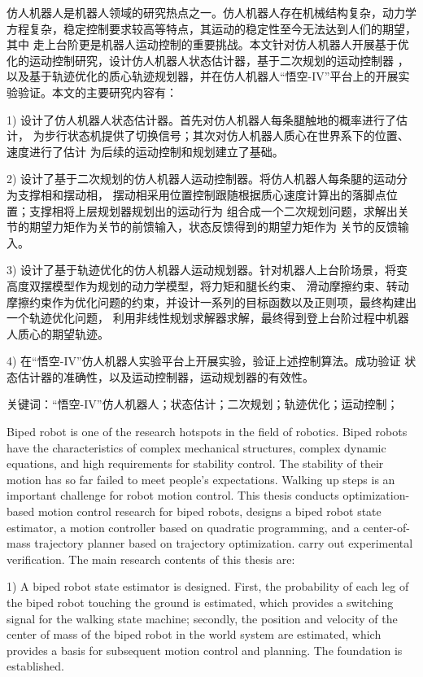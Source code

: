 \cleardoublepage
{}

仿人机器人是机器人领域的研究热点之一。仿人机器人存在机械结构复杂，动力学
方程复杂，稳定控制要求较高等特点，其运动的稳定性至今无法达到人们的期望，其中
走上台阶更是机器人运动控制的重要挑战。本文针对仿人机器人开展基于优化的运动控制研究，设计仿人机器人状态估计器，基于二次规划的运动控制器
，以及基于轨迹优化的质心轨迹规划器，并在仿人机器人“悟空-IV”平台上的开展实验验证。本文的主要研究内容有：

1) 设计了仿人机器人状态估计器。首先对仿人机器人每条腿触地的概率进行了估计，
为步行状态机提供了切换信号；其次对仿人机器人质心在世界系下的位置、速度进行了估计
为后续的运动控制和规划建立了基础。

2) 设计了基于二次规划的仿人机器人运动控制器。将仿人机器人每条腿的运动分为支撑相和摆动相，
摆动相采用位置控制跟随根据质心速度计算出的落脚点位置；支撑相将上层规划器规划出的运动行为
组合成一个二次规划问题，求解出关节的期望力矩作为关节的前馈输入，状态反馈得到的期望力矩作为
关节的反馈输入。

3) 设计了基于轨迹优化的仿人机器人运动规划器。针对机器人上台阶场景，将变高度双摆模型作为规划的动力学模型，将力矩和腿长约束、
滑动摩擦约束、转动摩擦约束作为优化问题的约束，并设计一系列的目标函数以及正则项，最终构建出一个轨迹优化问题，
利用非线性规划求解器求解，最终得到登上台阶过程中机器人质心的期望轨迹。

4) 在“悟空-IV”仿人机器人实验平台上开展实验，验证上述控制算法。成功验证
状态估计器的准确性，以及运动控制器，运动规划器的有效性。

$\textbf{关键词}$：“悟空-IV”仿人机器人；状态估计；二次规划；轨迹优化；运动控制；

\cleardoublepage
{}

Biped robot is one of the research hotspots in the field of robotics. Biped robots have the characteristics of complex mechanical structures, 
complex dynamic equations, and high requirements for stability control. The stability of their motion has so far failed to meet people's expectations. 
Walking up steps is an important challenge for robot motion control. This thesis conducts optimization-based motion control research for biped robots, 
designs a biped robot state estimator, a motion controller based on quadratic programming, and a center-of-mass trajectory planner based on trajectory optimization. 
carry out experimental verification. The main research contents of this thesis are:

1) A biped robot state estimator is designed. First, the probability of each leg of the biped robot touching the ground is estimated, 
which provides a switching signal for the walking state machine; secondly, the position and velocity of the center of mass of the biped robot in the world system are estimated, 
which provides a basis for subsequent motion control and planning. The foundation is established.

